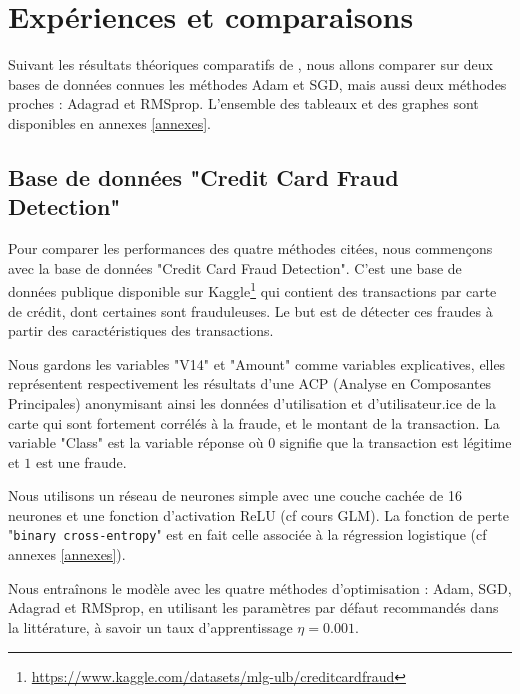 \documentclass[a4paper,12pt]{article}
\begin{document}
\section{Expériences et comparaisons}

Suivant les résultats théoriques comparatifs de \cite{wilson2017}, nous allons comparer sur deux bases de données connues les méthodes Adam et SGD, mais aussi deux méthodes proches : Adagrad et RMSprop. L'ensemble des tableaux et des graphes sont disponibles en annexes \ref{annexes}.

\subsection{Base de données "Credit Card Fraud Detection"}

Pour comparer les performances des quatre méthodes citées, nous commençons avec la base de données "Credit Card Fraud Detection". C'est une base de données publique disponible sur Kaggle\footnote{\url{https://www.kaggle.com/datasets/mlg-ulb/creditcardfraud}} qui contient des transactions par carte de crédit, dont certaines sont frauduleuses. Le but est de détecter ces fraudes à partir des caractéristiques des transactions. 
\par Nous gardons les variables "V14" et "Amount" comme variables explicatives, elles représentent respectivement les résultats d'une ACP (Analyse en Composantes Principales) anonymisant ainsi les données d'utilisation et d'utilisateur.ice de la carte qui sont fortement corrélés à la fraude, et le montant de la transaction. La variable "Class" est la variable réponse où $0$ signifie que la transaction est légitime et $1$ est une fraude. 
\par Nous utilisons un réseau de neurones simple avec une couche cachée de 16 neurones et une fonction d'activation ReLU (cf cours GLM). La fonction de perte "\texttt{binary cross-entropy}" est en fait celle associée à la régression logistique (cf annexes \ref{annexes}).
\par Nous entraînons le modèle avec les quatre méthodes d'optimisation : Adam, SGD, Adagrad et RMSprop, en utilisant les paramètres par défaut recommandés dans la littérature, à savoir un taux d'apprentissage $\eta=0.001$.\\
\end{document}
